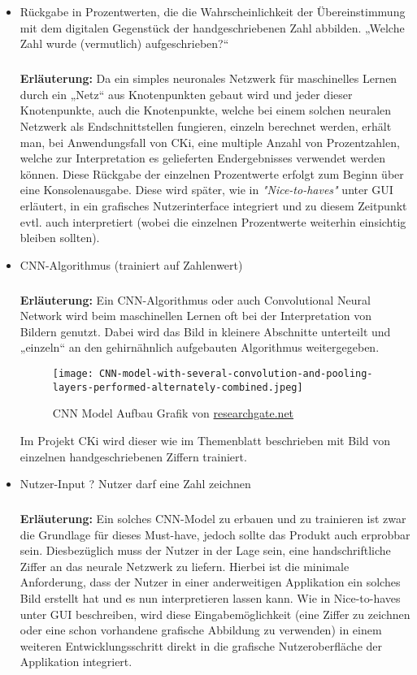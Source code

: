 \begin{itemize}
	\item 
	Rückgabe in Prozentwerten, die die Wahrscheinlichkeit der Übereinstimmung mit dem digitalen Gegenstück der handgeschriebenen Zahl abbilden. „Welche Zahl wurde (vermutlich) aufgeschrieben?“
	\subparagraph{}
	\textbf{Erläuterung:}
	Da ein simples neuronales Netzwerk für maschinelles Lernen durch ein „Netz“ aus Knotenpunkten gebaut wird und jeder dieser Knotenpunkte, auch die Knotenpunkte, welche bei einem solchen neuralen Netzwerk als Endschnittstellen fungieren, einzeln berechnet werden, erhält man, bei Anwendungsfall von CKi, eine multiple Anzahl von Prozentzahlen, welche zur Interpretation es gelieferten Endergebnisses verwendet werden können. Diese Rückgabe der einzelnen Prozentwerte erfolgt zum Beginn über eine Konsolenausgabe. Diese wird später, wie in \textit{"Nice-to-haves"} unter GUI erläutert, in ein grafisches Nutzerinterface integriert und zu diesem Zeitpunkt evtl. auch interpretiert (wobei die einzelnen Prozentwerte weiterhin einsichtig bleiben sollten).
	
	\item CNN-Algorithmus (trainiert auf Zahlenwert)
	\subparagraph{}
	\textbf{Erläuterung:}
	Ein CNN-Algorithmus oder auch Convolutional Neural Network wird beim maschinellen Lernen oft bei der Interpretation von Bildern genutzt. Dabei wird das Bild in kleinere Abschnitte unterteilt und „einzeln“ an den gehirnähnlich aufgebauten Algorithmus weitergegeben.
	\begin{figure}[H]
		\centering
		\texttt{[image: CNN-model-with-several-convolution-and-pooling-layers-performed-alternately-combined.jpeg]}
		\caption{CNN Model Aufbau Grafik von \href{https://www.researchgate.net/publication/309751512_Content-Aware_Convolutional_Neural_Network_for_Object_Recognition_Task}{researchgate.net}}
		\label{fig:AnalyseCNN-model-with-several-convolution-and-pooling-layers-performed-alternately-combined}
	\end{figure}
	Im Projekt CKi wird dieser wie im Themenblatt beschrieben mit Bild von einzelnen handgeschriebenen Ziffern trainiert.
	
	\item Nutzer-Input ? Nutzer darf eine Zahl zeichnen
	\subparagraph{}
	\textbf{Erläuterung:}
	Ein solches CNN-Model zu erbauen und zu trainieren ist zwar die Grundlage für dieses Must-have, jedoch sollte das Produkt auch erprobbar sein. Diesbezüglich muss der Nutzer in der Lage sein, eine handschriftliche Ziffer an das neurale Netzwerk zu liefern. Hierbei ist die minimale Anforderung, dass der Nutzer in einer anderweitigen Applikation ein solches Bild erstellt hat und es nun interpretieren lassen kann. Wie in Nice-to-haves unter GUI beschreiben, wird diese Eingabemöglichkeit (eine Ziffer zu zeichnen oder eine schon vorhandene grafische Abbildung zu verwenden) in einem weiteren Entwicklungsschritt direkt in die grafische Nutzeroberfläche der Applikation integriert.
	
\end{itemize}

